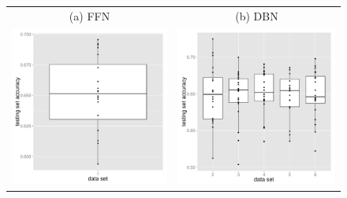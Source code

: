 \begin{figure}
\begin{centering}
\begin{tabular}{cc}
(a) FFN & (b) DBN\tabularnewline
\includegraphics[width=0.34\paperwidth]{images/breast_cancer_12-ffn-accuracies-testing-fa_ft.pdf} & \includegraphics[width=0.34\paperwidth]{images/breast_cancer_12-dbn-accuracies-testing-aa_dv.pdf}\tabularnewline

\end{tabular}
\end{centering}
\end{figure}
